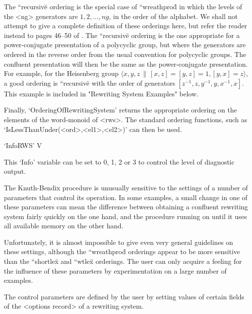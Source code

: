 The {``recursive\"} ordering is  the special case  of {``wreathprod\"}
in which the levels of the <ng> generators are $1,  2, \ldots, ng$, in
the order of the alphabet.  We shall not attempt
to give  a complete definition of  these orderings here, but refer the
reader instead to pages  46--50 of \cite{Sims94}.  The {``recursive\"}
ordering is the one appropriate  for a power-conjugate presentation of
a  polycyclic  group, but  where   the generators are  ordered  in the
reverse  order from the usual  convention  for polycyclic groups.  The
confluent  presentation will then  be the  same as the power-conjugate
presentation.  For example,  for the  Heisenberg  group $\langle x,y,z
\, \| \,  [x,z]=[y,z]=1,  [y,x]=z \rangle  $,   a
good   ordering  is {``recursive\"}  with    the  order of  generators
$[z^{-1},z,y^{-1},y,x^{-1},x]$.   This    example is     included   in
"Rewriting System Examples" below.

Finally, `OrderingOfRewritingSystem' returns the appropriate  {\GAP} ordering
on the elements of the word-monoid of <rws>. The standard {\GAP} ordering
functions, such as `IsLessThanUnder(<ord>,<el1>,<el2>)' can then be used.



\>`InfoRWS' V

This `Info' variable can be set to 0, 1, 2 or 3 to control the level
of diagnostic output.

The Knuth-Bendix procedure is unusually sensitive to the settings of a
number of parameters  that control its  operation. In some examples, a
small change  in   one of  these  parameters can  mean the  difference
between  obtaining a confluent  rewriting system fairly quickly on the
one hand, and  the  procedure running  on until it  uses all available
memory on the other hand.

Unfortunately, it is   almost  impossible to  give even  very  general
guidelines   on these   settings,  although the    {``wreathprod\"}
orderings appear to  be  more sensitive  than the {``shortlex\"}   and
{``wtlex\"} orderings.  The user  can  only acquire a  feeling for the
influence of these parameters by  experimentation on a large number of
examples.

The control  parameters are defined  by the user  by setting values of
certain fields of the <options record> of a rewriting system.

